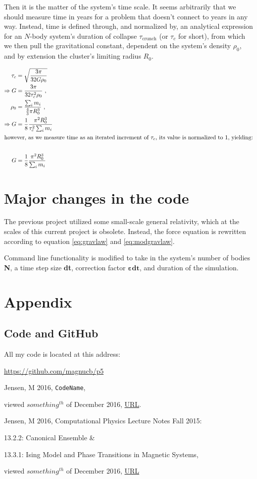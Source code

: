 \documentclass[11pt,a4paper,notitlepage,twocolumn]{article}
\begin{document}
Then it is the matter of the system's time scale. It seems arbitrarily that we should measure time in years for a problem that doesn't connect to years in any way. Instead, time is defined through, and normalized by, an analytical expression for an $N$-body system's duration of collapse $\tau_{\text{crunch}}$ (or $\tau_c$ for short), from which we then pull the gravitational constant, dependent on the system's density $\rho_0$, and by extension the cluster's limiting radius $R_0$.

\begin{align}\label{eq:tauc_and_G}
\tau_c &= \sqrt{\frac{3\pi}{32G\rho_0}} \nonumber \\
\Rightarrow G &= \frac{3\pi}{32\tau_c^2\rho_0}\ , \nonumber \\
\rho_0 &= \frac{\sum_{i} m_i}{\frac{4}{3}\pi R_0^3}\ , \nonumber \\
\Rightarrow G &= \frac{1}{8}\frac{\pi^2 R_0^3}{\tau_c^2 \sum_{i} m_i}\nonumber \\
\intertext{however, as we measure time as an iterated increment of $\tau_c$, its value is normalized to 1, yielding:}\nonumber \\
G &= \frac{1}{8}\frac{\pi^2 R_0^3}{\sum_{i} m_i}
\end{align}


\section{Major changes in the code}
The previous project utilized some small-scale general relativity, which at the scales of this current project is obsolete. Instead, the force equation is rewritten according to equation \ref{eq:gravlaw} and \ref{eq:modgravlaw}.

Command line functionality is modified to take in the system's number of bodies \textbf{N}, a time step size \textbf{dt}, correction factor $\mathbf{\varepsilon dt}$, and duration of the simulation.



\section{Appendix}
\subsection{Code and GitHub}
All my code is located at this address:

\url{https://github.com/magnucb/p5}

\begin{thebibliography}{9}
  Jensen, M 2016,
  \verb|CodeName|,
  
  viewed $something^{th}$ of December 2016,
  \url{URL}.
  
	Jensen, M 2016, 
	Computational Physics Lecture Notes Fall 2015:
	
	13.2.2: Canonical Ensemble \& 
	
	13.3.1: Ising Model and Phase Transitions in Magnetic Systems,
	
	viewed $something^{th}$ of December 2016, 
	\url{URL}

\end{thebibliography}
\end{document}
